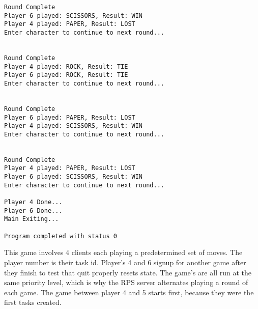 \documentclass[letterpaper]{article}
\begin{document}
\begin{verbatim}
Round Complete
Player 6 played: SCISSORS, Result: WIN
Player 4 played: PAPER, Result: LOST
Enter character to continue to next round...


Round Complete
Player 4 played: ROCK, Result: TIE
Player 6 played: ROCK, Result: TIE
Enter character to continue to next round...


Round Complete
Player 6 played: PAPER, Result: LOST
Player 4 played: SCISSORS, Result: WIN
Enter character to continue to next round...


Round Complete
Player 4 played: PAPER, Result: LOST
Player 6 played: SCISSORS, Result: WIN
Enter character to continue to next round...

Player 4 Done...
Player 6 Done...
Main Exiting...

Program completed with status 0

\end{verbatim}

This game involves 4 clients each playing a predetermined set of moves. The player number is their task id. Player's 4 and 6 signup for another game after they finish to test that quit properly resets state. The game's are all run at the same priority level, which is why the RPS server alternates playing a round of each game. The game between player 4 and 5 starts first, because they were the first tasks created.
\end{document}
